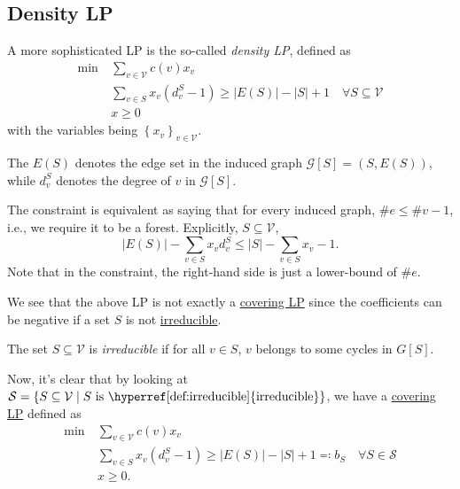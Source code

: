 \subsection{Density LP}
A more sophisticated LP is the so-called \emph{density LP}, defined as
\[
	\begin{aligned}
		\min~ & \sum_{v\in \mathcal{V} } c(v) x_v                                                                                                  \\
		      & \sum_{v\in S} x_v(d_v^{S} - 1) \geq \left\vert E(S) \right\vert - \left\vert S \right\vert + 1\quad \forall S\subseteq \mathcal{V} \\
		      & x\geq 0
	\end{aligned}
\]
with the variables being \(\left\{ x_v \right\} _{v\in \mathcal{V} }\).

\begin{notation}
	The \(E(S)\) denotes the edge set in the induced graph \(\mathcal{G} [S] = (S, E(S))\), while \(d_v^S\) denotes the degree of \(v\) in \(\mathcal{G} [S]\).
\end{notation}

\begin{intuition}
	The constraint is equivalent as  saying that for every induced graph, \(\# e \leq \# v - 1\), i.e., we require it to be a forest. Explicitly, \(S\subseteq \mathcal{V} \),
	\[
		\left\vert E(S) \right\vert - \sum_{v\in S} x_v d_v^S\leq \left\vert S \right\vert - \sum_{v\in S}x_v - 1.
	\]
	Note that in the constraint, the right-hand side is just a lower-bound of \(\# e\).
\end{intuition}

We see that the above LP is not exactly a \hyperref[def:covering-LP]{covering LP} since the coefficients can be negative if a set \(S\) is not \hyperref[def:irreducible]{irreducible}.

\begin{definition}[Irreducible]\label{def:irreducible}
	The set \(S\subseteq \mathcal{V} \) is \emph{irreducible} if for all \(v\in S\), \(v\) belongs to some cycles in \(G[S]\).
\end{definition}

Now, it's clear that by looking at \(\mathcal{S} = \left\{ S\subseteq \mathcal{V} \mid S \text{ is \hyperref[def:irreducible]{irreducible}}\right\} \), we have a \hyperref[def:covering-LP]{covering LP} defined as
\[
	\begin{aligned}
		\min~ & \sum_{v\in \mathcal{V} } c(v) x_v                                                                                                          \\
		      & \sum_{v\in S} x_v(d_v^{S} - 1) \geq \left\vert E(S) \right\vert - \left\vert S \right\vert + 1 \eqqcolon b_S\quad \forall S\in \mathcal{S} \\
		      & x\geq 0.
	\end{aligned}
\]

